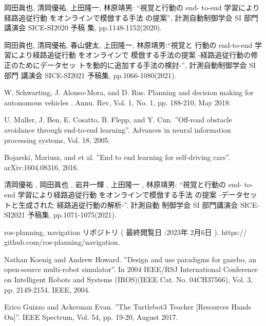 \documentclass{jarticle}
\begin{document}
\footnotesize
\begin{thebibliography}{99}

岡田眞也, 清岡優祐, 上田隆一, 林原靖男: “視覚と行動の end-
to-end 学習により経路追従行動 をオンラインで模倣する手法
の提案”, 計測自動制御学会 SI 部門講演会 SICE-SI2020 予稿
集, pp.1148-1152(2020).

岡田眞也, 清岡優祐, 春山健太, 上田隆一, 林原靖男:“視覚と
行動の end-to-end 学習により経路追従行動 をオンラインで
模倣する手法の提案 -経路追従行動の修正のためにデータセッ
トを動的に追加する手法の検討-”, 計測自動制御学会 SI 部門
講演会 SICE-SI2021 予稿集, pp.1066-1080(2021).

W. Schwarting, J. Alonso-Mora, and D. Rus.
Planning and decision making for
autonomous vehicles . Annu. Rev, Vol. 1, No. 1, pp. 188-210, May 2018.

U. Muller, J. Ben, E. Cosatto, B. Flepp, and Y. Cun. ”Oﬀ-road obstacle avoidance
through end-to-end learning”. Advances in neural information processing systems,
Vol. 18, 2005.

Bojarski, Mariusz, and et al.
”End to end learning for self-driving cars”.
arXiv:1604.08316, 2016.

清岡優祐 , 岡田眞也 , 岩井一輝 , 上田隆一 , 林原靖男: “視覚と行動の end-
to-end 学習により経路追従行動 をオンラインで模倣する手法
の提案 -データセットと生成された
経路追従行動の解析-”. 計測自動 制御学会 SI 部門講演会 SICE-SI2021 予稿集, pp.1071-1075(2021).

ros-planning, navigation リポジトリ ( 最終閲覧日 :2023年 2月6日 ). https://
github.com/ros-planning/navigation.

Nathan Koenig and Andrew Howard. ”Design and use paradigms for gazebo, an
open-source multi-robot simulator”. In 2004 IEEE/RSJ International Conference
on Intelligent Robots and Systems (IROS)(IEEE Cat. No. 04CH37566), Vol. 3, pp.
2149-2154. IEEE, 2004.

Erico Guizzo and Ackerman Evan. ”The Turtlebot3 Teacher [Resources Hands On]”.
IEEE Spectrum, Vol. 54, pp. 19-20, August 2017.

\end{thebibliography}

\normalsize
\end{document}
